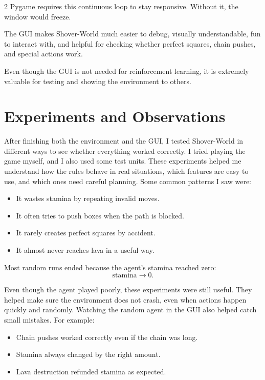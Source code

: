 \documentclass[a4paper]{article}
\begin{document}
\begin{multicols}{2}
Pygame requires this continuous loop to stay responsive. Without it, the window would freeze.

The GUI makes Shover-World much easier to debug, visually understandable, fun to interact with, and helpful for checking whether perfect squares, chain pushes, and special actions work.

Even though the GUI is not needed for reinforcement learning, it is extremely valuable for testing and showing the environment to others.






\section{Experiments and Observations}

After finishing both the environment and the GUI, I tested Shover-World in different ways to see whether everything worked correctly. I tried playing the game myself, and I also used some test units. These experiments helped me understand how the rules behave in real situations, which features are easy to use, and which ones need careful planning. Some common patterns I saw were:

\begin{itemize}
    \item It wastes stamina by repeating invalid moves.
    \item It often tries to push boxes when the path is blocked.
    \item It rarely creates perfect squares by accident.
    \item It almost never reaches lava in a useful way.
\end{itemize}

Most random runs ended because the agent's stamina reached zero:
\[
\text{stamina} \rightarrow 0.
\]

Even though the agent played poorly, these experiments were still useful. They helped make sure the environment does not crash, even when actions happen quickly and randomly. Watching the random agent in the GUI also helped catch small mistakes. For example:

\begin{itemize}
    \item Chain pushes worked correctly even if the chain was long.
    \item Stamina always changed by the right amount.
    \item Lava destruction refunded stamina as expected.
\end{itemize}


\end{multicols}
\end{document}
